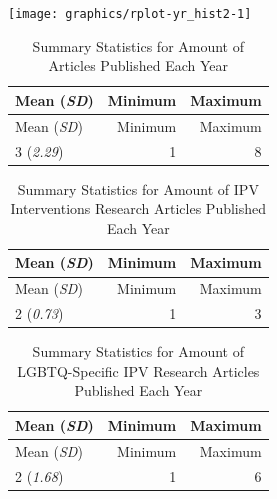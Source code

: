 \documentclass[]{tufte-handout}
\begin{document}
\tufteskip

\begin{fullwidth}\begin{centering}



\texttt{[image: graphics/rplot-yr\_hist2-1]} 


\end{centering}\end{fullwidth}

\newpage

\begin{longtable}[]{@{}lrr@{}}
\caption{Summary Statistics for Amount of Articles Published Each
Year}\tabularnewline
\toprule
Mean (\textit{SD}) & Minimum & Maximum\tabularnewline
\midrule
\endfirsthead
\toprule
Mean (\textit{SD}) & Minimum & Maximum\tabularnewline
\midrule
\endhead
3 (\textit{2.29}) & 1 & 8\tabularnewline
\bottomrule
\end{longtable}

\begin{longtable}[]{@{}lrr@{}}
\caption{Summary Statistics for Amount of IPV Interventions Research
Articles Published Each Year}\tabularnewline
\toprule
Mean (\textit{SD}) & Minimum & Maximum\tabularnewline
\midrule
\endfirsthead
\toprule
Mean (\textit{SD}) & Minimum & Maximum\tabularnewline
\midrule
\endhead
2 (\textit{0.73}) & 1 & 3\tabularnewline
\bottomrule
\end{longtable}

\begin{longtable}[]{@{}lrr@{}}
\caption{Summary Statistics for Amount of LGBTQ-Specific IPV Research
Articles Published Each Year}\tabularnewline
\toprule
Mean (\textit{SD}) & Minimum & Maximum\tabularnewline
\midrule
\endfirsthead
\toprule
Mean (\textit{SD}) & Minimum & Maximum\tabularnewline
\midrule
\endhead
2 (\textit{1.68}) & 1 & 6\tabularnewline
\bottomrule
\end{longtable}

\tufteskip
\end{document}
